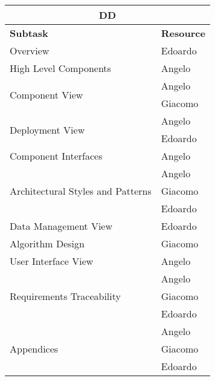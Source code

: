 \begin{center}
\begin{tabular} {|l|l|}
	\multicolumn{2}{c}{\textbf{DD}} \\ \hline
	\textbf{Subtask} & \textbf{Resource} \\ \hline
	\multirow{1}{*}{Overview} & Edoardo \\ \hline
	\multirow{1}{*}{High Level Components} & Angelo \\ \hline
	\multirow{2}{*}{Component View} & Angelo \\
									& Giacomo \\ \hline
	\multirow{2}{*}{Deployment View} & Angelo \\
				& Edoardo \\ \hline
	\multirow{1}{*}{Component Interfaces} & Angelo \\ \hline
	\multirow{3}{*}{Architectural Styles and Patterns} & Angelo \\ 
				& Giacomo \\
				& Edoardo \\ \hline
	\multirow{1}{*}{Data Management View} & Edoardo \\ \hline
	\multirow{1}{*}{Algorithm Design} & Giacomo \\ \hline
	\multirow{1}{*}{User Interface View} & Angelo \\ \hline
	\multirow{3}{*}{Requirements Traceability} & Angelo \\ 
				& Giacomo \\
				& Edoardo \\ \hline
	\multirow{3}{*}{Appendices} & Angelo \\ 
				& Giacomo \\
				& Edoardo \\ \hline
\end{tabular}
\end{center}

\vspace* {30px}

